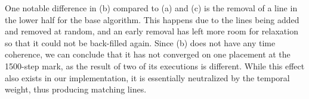 One notable difference in (b) compared to (a) and (c) is the removal of a line in the lower half for the base algorithm.
This happens due to the lines being added and removed at random, and an early removal has left more room for relaxation so that it could not be back-filled again.
Since (b) does not have any time coherence, we can conclude that it has not converged on one placement at the 1500-step mark,
as the result of two of its executions is different.
While this effect also exists in our implementation, it is essentially neutralized by the temporal weight, thus producing matching lines.

\newpage

